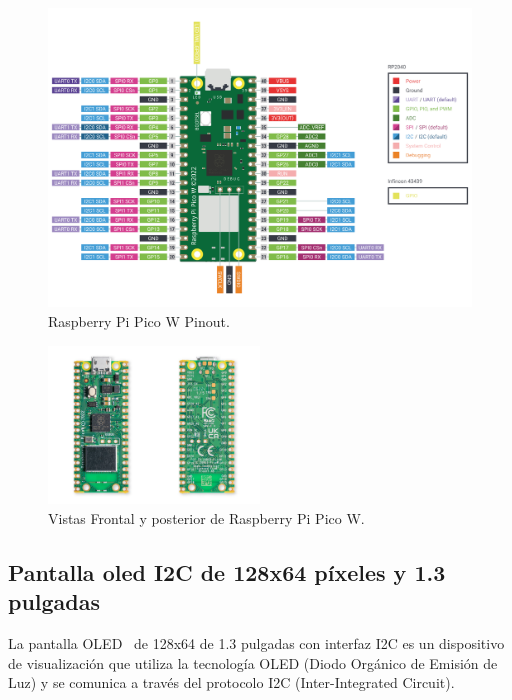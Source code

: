 \begin{figure}[h]
    \centering
    \includegraphics[width=1\textwidth]{img/herramientas/picow.png}
    \caption{Raspberry Pi Pico W Pinout.}
\end{figure}

\begin{figure}[h]
    \centering
    \includegraphics[width=0.5\textwidth]{img/herramientas/picow_vistas.png}
    \caption{Vistas Frontal y posterior de Raspberry Pi Pico W.}
\end{figure}

\pagebreak

\subsection{Pantalla oled I2C de 128x64 píxeles y 1.3 pulgadas}
La pantalla OLED~\cite{manual:Oled} de 128x64 de 1.3 pulgadas con interfaz I2C es un dispositivo de visualización que utiliza la tecnología OLED (Diodo Orgánico de Emisión de Luz) y se comunica a través del protocolo I2C (Inter-Integrated Circuit).

